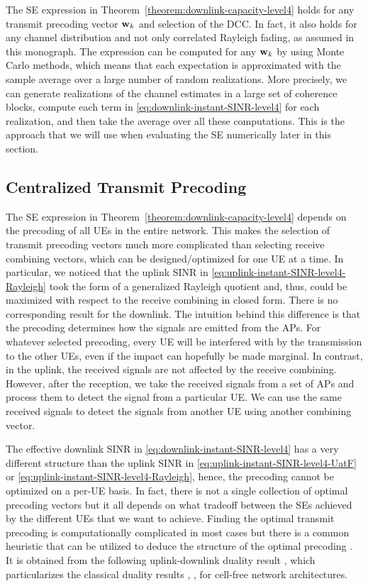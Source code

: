 The SE expression in Theorem~\ref{theorem:downlink-capacity-level4} holds for any transmit precoding vector $\mathbf{w}_{k}$ and selection of the DCC. In fact, it also holds for any channel distribution and not only correlated Rayleigh fading, as assumed in this monograph.
The expression can be computed for any $\mathbf{w}_{k}$ by using Monte Carlo methods, which means that each expectation is approximated with the sample average over a large number of random realizations. More precisely, we can generate realizations of the channel estimates in a large set of coherence blocks, compute each term in \eqref{eq:downlink-instant-SINR-level4} for each realization, and then take the average over all these computations. This is the approach that we will use when evaluating the SE numerically later in this section.

\subsection{Centralized Transmit Precoding}
\label{subsec:centralized-precoding}

The SE expression in Theorem~\ref{theorem:downlink-capacity-level4} depends on the precoding of all UEs in the entire network. This makes the selection of transmit precoding vectors much more complicated than selecting receive combining vectors, which can be designed/optimized for one UE at a time. 
In particular, we noticed that the uplink SINR in \eqref{eq:uplink-instant-SINR-level4-Rayleigh} took the form of a generalized Rayleigh quotient and, thus, could be maximized with respect to the receive combining in closed form. There is no corresponding result for the downlink.
The intuition behind this difference is that the precoding determines how the signals are emitted from the APs. For whatever selected precoding, every UE will be interfered with by the transmission to the other UEs, even if the impact can hopefully be made marginal. In contrast, in the uplink, the received signals are not affected by the receive combining. However, after the reception, we take the received signals from a set of APs and process them to detect the signal from a particular UE. We can use the same received signals to detect the signals from another UE using another combining vector. 

The effective downlink SINR in \eqref{eq:downlink-instant-SINR-level4} has a very different structure than the uplink SINR in \eqref{eq:uplink-instant-SINR-level4-UatF} or \eqref{eq:uplink-instant-SINR-level4-Rayleigh},
 hence, the precoding cannot be optimized on a per-UE basis. In fact, there is not a single collection of optimal precoding vectors but it all depends on what tradeoff between the SEs achieved by the different UEs that we want to achieve.
Finding the optimal transmit precoding is computationally complicated in most cases \cite{Bjornson2013d} but there is a common heuristic that can be utilized to deduce the structure of the optimal precoding \cite{Bjornson2014d}.
It is obtained from the following uplink-downlink duality result \cite{Bjornson2020a}, which particularizes the classical duality results \cite{Boche2002a}, \cite{Tse2005a}, \cite{Viswanath2003a} for cell-free network architectures.

